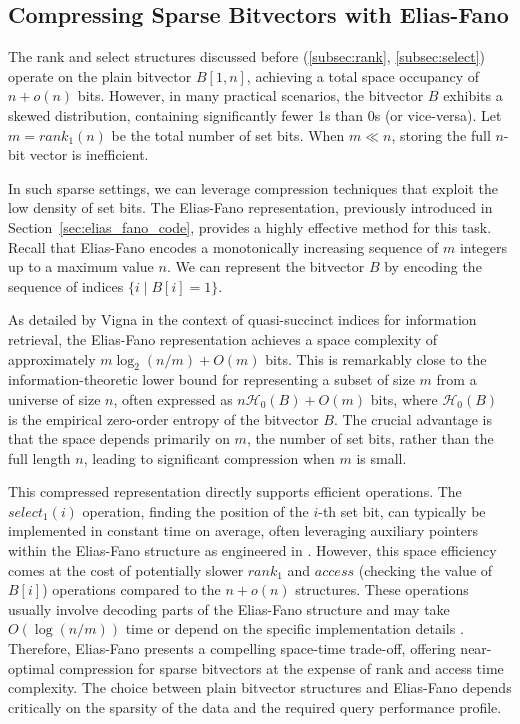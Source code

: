 \subsection{Compressing Sparse Bitvectors with Elias-Fano} \label{subsec:elias_fano_compression}

The rank and select structures discussed before (\ref{subsec:rank}, \ref{subsec:select}) operate on the plain bitvector $B[1,n]$, achieving a total space occupancy of $n + o(n)$ bits. However, in many practical scenarios, the bitvector $B$ exhibits a skewed distribution, containing significantly fewer 1s than 0s (or vice-versa). Let $m = rank_1(n)$ be the total number of set bits. When $m \ll n$, storing the full $n$-bit vector is inefficient.

In such sparse settings, we can leverage compression techniques that exploit the low density of set bits. The Elias-Fano representation, previously introduced in Section~\ref{sec:elias_fano_code}, provides a highly effective method for this task. Recall that Elias-Fano encodes a monotonically increasing sequence of $m$ integers up to a maximum value $n$. We can represent the bitvector $B$ by encoding the sequence of indices $\{ i \mid B[i]=1 \}$.

As detailed by Vigna \cite{vigna2013quasi} in the context of quasi-succinct indices for information retrieval, the Elias-Fano representation achieves a space complexity of approximately $m \log_2(n/m) + O(m)$ bits. This is remarkably close to the information-theoretic lower bound for representing a subset of size $m$ from a universe of size $n$, often expressed as $n\mathcal{H}_0(B) + O(m)$ bits, where $\mathcal{H}_0(B)$ is the empirical zero-order entropy of the bitvector $B$. The crucial advantage is that the space depends primarily on $m$, the number of set bits, rather than the full length $n$, leading to significant compression when $m$ is small.

This compressed representation directly supports efficient operations. The $select_1(i)$ operation, finding the position of the $i$-th set bit, can typically be implemented in constant time on average, often leveraging auxiliary pointers within the Elias-Fano structure as engineered in \cite{vigna2013quasi}. However, this space efficiency comes at the cost of potentially slower $rank_1$ and $access$ (checking the value of $B[i]$) operations compared to the $n+o(n)$ structures. These operations usually involve decoding parts of the Elias-Fano structure and may take $O(\log(n/m))$ time or depend on the specific implementation details \cite{navarro2016compact}. Therefore, Elias-Fano presents a compelling space-time trade-off, offering near-optimal compression for sparse bitvectors at the expense of rank and access time complexity. The choice between plain bitvector structures and Elias-Fano depends critically on the sparsity of the data and the required query performance profile.

